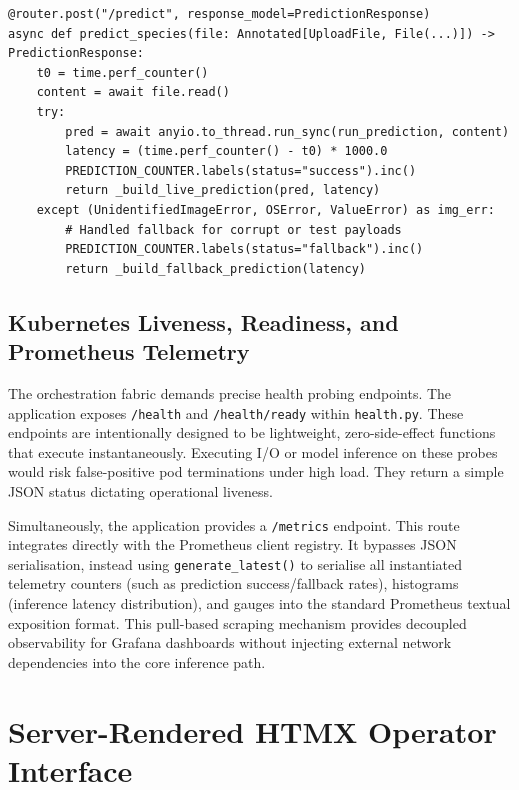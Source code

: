 \begin{listing}[htpb]
\begin{verbatim}
@router.post("/predict", response_model=PredictionResponse)
async def predict_species(file: Annotated[UploadFile, File(...)]) -> PredictionResponse:
    t0 = time.perf_counter()
    content = await file.read()
    try:
        pred = await anyio.to_thread.run_sync(run_prediction, content)
        latency = (time.perf_counter() - t0) * 1000.0
        PREDICTION_COUNTER.labels(status="success").inc()
        return _build_live_prediction(pred, latency)
    except (UnidentifiedImageError, OSError, ValueError) as img_err:
        # Handled fallback for corrupt or test payloads
        PREDICTION_COUNTER.labels(status="fallback").inc()
        return _build_fallback_prediction(latency)
\end{verbatim}
\caption{Simplified excerpt of the offloaded asynchronous prediction handler.}
\label{lst:predict_endpoint}
\end{listing}

\subsection{Kubernetes Liveness, Readiness, and Prometheus Telemetry}

The orchestration fabric demands precise health probing endpoints. The application exposes \texttt{/health} and \texttt{/health/ready} within \texttt{health.py}. These endpoints are intentionally designed to be lightweight, zero-side-effect functions that execute instantaneously. Executing I/O or model inference on these probes would risk false-positive pod terminations under high load. They return a simple JSON status dictating operational liveness.

Simultaneously, the application provides a \texttt{/metrics} endpoint. This route integrates directly with the Prometheus client registry. It bypasses JSON serialisation, instead using \texttt{generate\_latest()} to serialise all instantiated telemetry counters (such as prediction success/fallback rates), histograms (inference latency distribution), and gauges into the standard Prometheus textual exposition format. This pull-based scraping mechanism provides decoupled observability for Grafana dashboards without injecting external network dependencies into the core inference path.

\section{Server-Rendered HTMX Operator Interface}
\label{sec:htmx_operator_interface}

